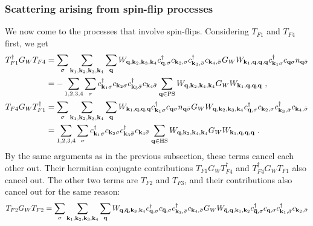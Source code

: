 \documentclass[reprint,hidelinks]{revtex4-2}
\begin{document}
\begin{widetext}
\subsubsection*{Scattering arising from spin-flip processes}
We now come to the processes that involve spin-flips. Considering \(T_{F1}\) and \(T_{F4}\) first, we get
\begin{equation}\begin{aligned}
	T_{F1}^\dagger G_W T_{F4} &= \sum_\sigma\sum_{{\bf k}_1, {\bf k}_2, {\bf k}_3, {\bf k}_4} \sum_{\bf q} W_{{\bf q},{\bf k}_2,{\bf k}_3,{\bf k}_4}c^\dagger_{{\bf q},\sigma}c_{{\bf k}_2,\sigma}c^\dagger_{{\bf k}_3,\bar\sigma}c_{{\bf k}_4,\bar\sigma} G_W W_{{\bf k}_1, {\bf q}, {\bf q}, {\bf q}}  c^\dagger_{{\bf k}_1\sigma} c_{{\bf q}\sigma} n_{{\bf q} \bar \sigma} \\
							  &= -\sum_{1,2,3,4}\sum_\sigma c^\dagger_{{\bf k}_1\sigma} c_{{\bf k}_2\sigma} c^\dagger_{{\bf k}_3\bar\sigma} c_{{\bf k}_4\bar \sigma} \sum_{\bf q \in \text{PS}} W_{{\bf q}, {\bf k}_2, {\bf k}_4, {\bf k}_4} G_W W_{{\bf k}_1, {\bf q}, {\bf q}, {\bf q}}~,\\
	T_{F4} G_W T_{F1}^\dagger &= \sum_\sigma\sum_{{\bf k}_1, {\bf k}_2, {\bf k}_3, {\bf k}_4} \sum_{\bf q}W_{{\bf k}_1, {\bf q}, {\bf q}, {\bf q}}  c^\dagger_{{\bf k}_1\sigma} c_{{\bf q}\sigma} n_{{\bf q} \bar \sigma} G_W W_{{\bf q},{\bf k}_2,{\bf k}_3,{\bf k}_4}c^\dagger_{{\bf q},\sigma}c_{{\bf k}_2,\sigma}c^\dagger_{{\bf k}_3,\bar\sigma}c_{{\bf k}_4,\bar\sigma}  \\
							  &= \sum_{1,2,3,4}\sum_\sigma c^\dagger_{{\bf k}_1\sigma} c_{{\bf k}_2\sigma} c^\dagger_{{\bf k}_3\bar\sigma} c_{{\bf k}_4\bar \sigma} \sum_{\bf q \in \text{HS}} W_{{\bf q}, {\bf k}_2, {\bf k}_4, {\bf k}_4} G_W W_{{\bf k}_1, {\bf q}, {\bf q}, {\bf q}}~.
\end{aligned}\end{equation}
By the same arguments as in the previous subsection, these terms cancel each other out. Their hermitian conjugate contributions \(T_{F1} G_W T_{F4}^\dagger\) and \(T_{F4}^\dagger G_W T_{F1}\) also cancel out. The other two terms are \(T_{F2}\) and \(T_{F3}\), and their contributions also cancel out for the same reason:
\begin{equation}\begin{aligned}
	T_{F2} G_W T_{F2} &= \sum_\sigma\sum_{{\bf k}_1, {\bf k}_2, {\bf k}_3, {\bf k}_4} \sum_{\bf q}W_{{\bf q},{\bf \bar q},{\bf k}_3,{\bf k}_4} c^\dagger_{{\bf q},\sigma}c_{{\bf \bar q},\sigma}c^\dagger_{{\bf k}_3,\bar\sigma}c_{{\bf k}_4,\bar\sigma} G_W W_{{\bf \bar q},{\bf q},{\bf k}_1,{\bf k}_2} c^\dagger_{{\bf \bar q},\sigma}c_{{\bf q},\sigma}c^\dagger_{{\bf k}_1,\bar\sigma}c_{{\bf k}_2,\bar\sigma} \\

\end{aligned}
\end{equation}
\end{widetext}
\end{document}
